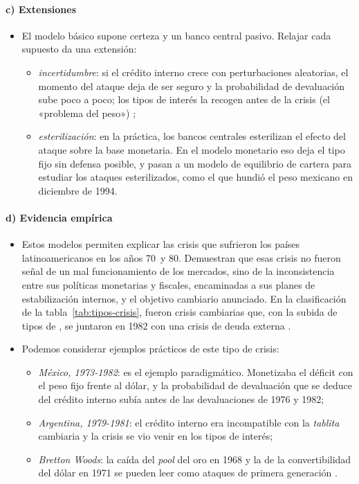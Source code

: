 \documentclass[11pt]{article}
\begin{document}
\paragraph{c) Extensiones}

\begin{itemize}
\item El modelo básico supone certeza y un banco central pasivo. Relajar cada supuesto da una extensión:
  \begin{itemize}
  \item \emph{incertidumbre}: si el crédito interno crece con perturbaciones aleatorias, el momento del ataque deja de ser seguro y la probabilidad de devaluación sube poco a poco; los tipos de interés la recogen antes de la crisis (el «problema del peso»)\nocite{FloodGarber1984} ;
  \item \emph{esterilización}: en la práctica, los bancos centrales esterilizan el efecto del ataque sobre la base monetaria. En el modelo monetario eso deja el tipo fijo sin defensa posible, y \textcite{FloodGarberKramer1996Collapsing} pasan a un modelo de equilibrio de cartera para estudiar los ataques esterilizados, como el que hundió el peso mexicano en diciembre de 1994.
  \end{itemize}
\end{itemize}

\paragraph{d) Evidencia empírica}

\begin{itemize}
\item Estos modelos permiten explicar las crisis que sufrieron los países latinoamericanos en los años 70~y 80. Demuestran que esas crisis no fueron señal de un mal funcionamiento de los mercados, sino de la inconsistencia entre sus políticas monetarias y fiscales, encaminadas a sus planes de estabilización internos, y el objetivo cambiario anunciado. En la clasificación de la tabla~\ref{tab:tipos-crisis}, fueron crisis cambiarias que, con la subida de tipos de , se juntaron en 1982 con una crisis de deuda externa .
\item Podemos considerar ejemplos prácticos de este tipo de crisis:
  \begin{itemize}
  \item \emph{México, 1973-1982}: es el ejemplo paradigmático. Monetizaba el déficit con el peso fijo frente al dólar, y la probabilidad de devaluación que se deduce del crédito interno subía antes de las devaluaciones de 1976 y 1982\nocite{BlancoGarber1986};
  \item \emph{Argentina, 1979-1981}: el crédito interno era incompatible con la \emph{tablita} cambiaria y la crisis se vio venir en los tipos de interés\nocite{CumbyVanWijnbergen1989Financial};
  \item \emph{Bretton Woods}: la caída del \emph{pool} del oro en 1968 y la de la convertibilidad del dólar en 1971 se pueden leer como ataques de primera generación\nocite{Garber1993Collapse} .
  \end{itemize}
\end{itemize}
\end{document}
